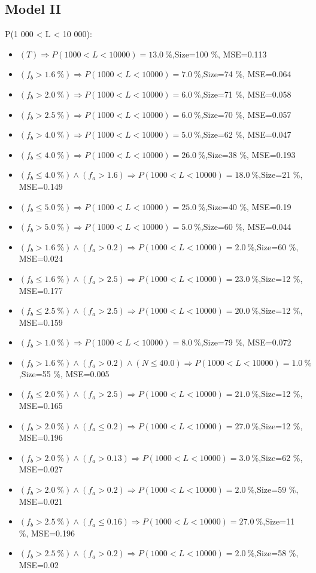 \documentclass[numbered]{CSL}
\begin{document}
\subsection{Model II}
P(1 000 < L < 10 000):
\begin{itemize}
\item $(T) \Rightarrow P(1 000 < L < 10 000) = 13.0~\%$,\hfill Size=100 \%, MSE=0.113
\item $(f_b > 1.6~\%) \Rightarrow P(1 000 < L < 10 000) = 7.0~\%$,\hfill Size=74 \%, MSE=0.064
\item $(f_b > 2.0~\%) \Rightarrow P(1 000 < L < 10 000) = 6.0~\%$,\hfill Size=71 \%, MSE=0.058
\item $(f_b > 2.5~\%) \Rightarrow P(1 000 < L < 10 000) = 6.0~\%$,\hfill Size=70 \%, MSE=0.057
\item $(f_b > 4.0~\%) \Rightarrow P(1 000 < L < 10 000) = 5.0~\%$,\hfill Size=62 \%, MSE=0.047
\item $(f_b \leq 4.0~\%) \Rightarrow P(1 000 < L < 10 000) = 26.0~\%$,\hfill Size=38 \%, MSE=0.193
\item $(f_b \leq 4.0~\%) \land (f_a > 1.6) \Rightarrow P(1 000 < L < 10 000) = 18.0~\%$,\hfill Size=21 \%, MSE=0.149
\item $(f_b \leq 5.0~\%) \Rightarrow P(1 000 < L < 10 000) = 25.0~\%$,\hfill Size=40 \%, MSE=0.19
\item $(f_b > 5.0~\%) \Rightarrow P(1 000 < L < 10 000) = 5.0~\%$,\hfill Size=60 \%, MSE=0.044
\item $(f_b > 1.6~\%) \land (f_a > 0.2) \Rightarrow P(1 000 < L < 10 000) = 2.0~\%$,\hfill Size=60 \%, MSE=0.024
\item $(f_b \leq 1.6~\%) \land (f_a > 2.5) \Rightarrow P(1 000 < L < 10 000) = 23.0~\%$,\hfill Size=12 \%, MSE=0.177
\item $(f_b \leq 2.5~\%) \land (f_a > 2.5) \Rightarrow P(1 000 < L < 10 000) = 20.0~\%$,\hfill Size=12 \%, MSE=0.159
\item $(f_b > 1.0~\%) \Rightarrow P(1 000 < L < 10 000) = 8.0~\%$,\hfill Size=79 \%, MSE=0.072
\item $(f_b > 1.6~\%) \land (f_a > 0.2) \land (N \leq 40.0) \Rightarrow P(1 000 < L < 10 000) = 1.0~\%$,\hfill Size=55 \%, MSE=0.005
\item $(f_b \leq 2.0~\%) \land (f_a > 2.5) \Rightarrow P(1 000 < L < 10 000) = 21.0~\%$,\hfill Size=12 \%, MSE=0.165
\item $(f_b > 2.0~\%) \land (f_a \leq 0.2) \Rightarrow P(1 000 < L < 10 000) = 27.0~\%$,\hfill Size=12 \%, MSE=0.196
\item $(f_b > 2.0~\%) \land (f_a > 0.13) \Rightarrow P(1 000 < L < 10 000) = 3.0~\%$,\hfill Size=62 \%, MSE=0.027
\item $(f_b > 2.0~\%) \land (f_a > 0.2) \Rightarrow P(1 000 < L < 10 000) = 2.0~\%$,\hfill Size=59 \%, MSE=0.021
\item $(f_b > 2.5~\%) \land (f_a \leq 0.16) \Rightarrow P(1 000 < L < 10 000) = 27.0~\%$,\hfill Size=11 \%, MSE=0.196
\item $(f_b > 2.5~\%) \land (f_a > 0.2) \Rightarrow P(1 000 < L < 10 000) = 2.0~\%$,\hfill Size=58 \%, MSE=0.02
\end{itemize}
\end{document}

